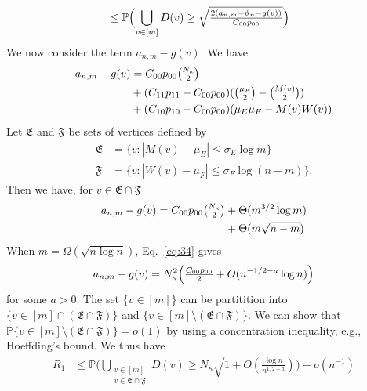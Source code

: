\documentclass[final]{IEEEtran}
\theoremstyle{definition}
\begin{document}
\begin{IEEEproof}
\begin{IEEEproof}[Eq.~\eqref{eq:27}]
\begin{equation}
\begin{split}
    &\leq \mathbb{P}\Bigl(\bigcup_{v \in [m]} D(v) \geq
      \sqrt{\tfrac{2 (a_{n,m} - \vartheta_n -
        g(v))}{C_{00} p_{00}}} \Bigr)
  \end{split}
\end{equation}
We now consider the term $a_{n,m} - g(v)$. We have
\begin{equation*}
  \begin{split}
  a_{n,m} - g(v) &= C_{00} p_{00} \tbinom{N_\kappa}{2} \\ &+ (C_{11}p_{11} -
  C_{00} p_{00})(\tbinom{\mu_E}{2} - \tbinom{M(v)}{2})
  \\ &+ (C_{10} p_{10} - C_{00} p_{00})(\mu_E\mu_F - M(v)W(v))
  \end{split}
\end{equation*}
Let $\mathfrak{E}$ and $\mathfrak{F}$ be sets of vertices defined by
\begin{align}
\mathfrak{E} &=
\{v \colon |M(v) - \mu_E| \leq \sigma_E \log{m}\} \\ \mathfrak{F} &=
\{v \colon |W(v) - \mu_F| \leq \sigma_F \log{(n-m)}\}.
\end{align}
Then we have, for $v \in \mathfrak{E} \cap \mathfrak{F}$
\begin{equation}
  \label{eq:34}
  \begin{split}
  a_{n,m} - g(v) =  C_{00} p_{00} \tbinom{N_\kappa}{2} &+
  \Theta(m^{3/2} \log{m}) \\ &+ 
  \Theta(m \sqrt{n - m}) \\
  \end{split}
\end{equation}
When $m = \Omega(\sqrt{n \log n})$, Eq.~\eqref{eq:34} gives
\begin{equation}
  \label{eq:35}
  a_{n,m} - g(v) = N_{\kappa}^{2}\Bigl(\tfrac{C_{00}p_{00}}{2} + O(n^{-1/2 - a}
  \log{n})\Bigr)
\end{equation}
for some $a > 0$. The set $\{v \in [m]\}$ can be partitition into
$\{v \in [m] \cap (\mathfrak{E} \cap\mathfrak{F})\}$ and $\{v \in [m]
\setminus (\mathfrak{E} \cap \mathfrak{F})\}$. We can show that
$\mathbb{P}\{v \in [m] \setminus (\mathfrak{E} \cap \mathfrak{F})\} =
o(1)$ by using a concentration inequality, e.g., Hoeffding's
bound. We thus have
\begin{equation}
  \label{eq:37}
  \begin{split}
    R_1 &\leq \mathbb{P}\biggl( \bigcup_{\substack{v \in [m] \\ v
        \in \mathfrak{E} \cap \mathfrak{F}}} D(v) \geq
    N_{\kappa} \sqrt{1 + O(\tfrac{\log{n}}{n^{1/2+a}})} \Bigr) + o(n^{-1}) \\

\end{split}
\end{equation}
\end{IEEEproof}
\end{IEEEproof}
\end{document}

